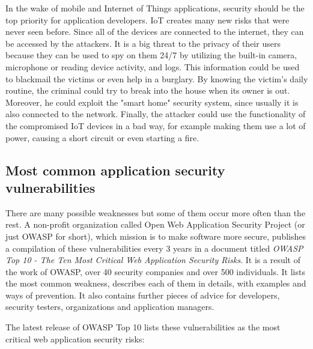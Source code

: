 \documentclass[a4paper]{article}
\begin{document}
In the wake of mobile and Internet of Things applications, security should be
the top priority for application developers. IoT creates many new risks that
were never seen before. Since all of the devices are connected to the internet,
they can be accessed by the attackers. It is a big threat to the privacy of
their users because they can be used to spy on them 24/7 by utilizing the
built-in camera, microphone or reading device activity, and logs. This
information could be used to blackmail the victims or even help in a burglary.
By knowing the victim's daily routine, the criminal could try to break into the
house when its owner is out. Moreover, he could exploit the "smart home"
security system, since usually it is also connected to the network. Finally,
the attacker could use the functionality of the compromised IoT devices in a
bad way, for example making them use a lot of power, causing a short circuit or
even starting a fire.\autocite{iotsec}

\subsection{Most common application security vulnerabilities}

There are many possible weaknesses but some of them occur more often than the
rest. A non-profit organization called Open Web Application Security Project
(or just OWASP for short), which mission is to make software more secure,
publishes a compilation of these vulnerabilities every 3 years in a document
titled \textit{OWASP Top 10 - The Ten Most Critical Web Application Security
Risks}\autocite{owasptop10}. It is a result of the work of OWASP, over 40
security companies and over 500 individuals. It lists the most common weakness,
describes each of them in details, with examples and ways of prevention. It
also contains further pieces of advice for developers, security testers,
organizations and application managers.

The latest release of OWASP Top 10 lists these vulnerabilities as the most
critical web application security risks:
\end{document}

